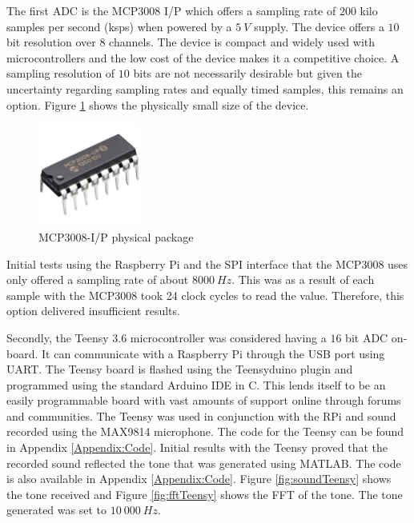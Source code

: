 The first ADC is the MCP3008 I/P which offers a sampling rate of $200$ kilo samples per second (ksps) when powered by a $5\ V$ supply. The device offers a $10$ bit resolution over 8 channels. The device is compact and widely used with microcontrollers and the low cost of the device makes it a competitive choice. A sampling resolution of $10$ bits are not necessarily desirable but given the uncertainty regarding sampling rates and equally timed samples, this remains an option. Figure \ref{fig:mcp3008} shows the physically small size of the device.

\begin{figure}[h!]
    \centering
    \includegraphics[width = 0.3\textwidth]{images/mcp3008.pdf}
    \caption{MCP3008-I/P physical package \cite{noauthor_mcp3008_nodate}}\label{fig:mcp3008}
\end{figure}

Initial tests using the Raspberry Pi and the SPI interface that the MCP3008 uses only offered a sampling rate of about $8000\ Hz$. This was as a result of each sample with the MCP3008 took 24 clock cycles to read the value. Therefore, this option delivered insufficient results.

Secondly, the Teensy 3.6 microcontroller was considered having a $16$ bit ADC on-board. It can communicate with a Raspberry Pi through the USB port using UART. The Teensy board is flashed using the Teensyduino plugin and programmed using the standard Arduino IDE in C. This lends itself to be an easily programmable board with vast amounts of support online through forums and communities. The Teensy was used in conjunction with the RPi and sound recorded using the MAX9814 microphone. The code for the Teensy can be found in Appendix \ref{Appendix:Code}. Initial results with the Teensy proved that the recorded sound reflected the tone that was generated using MATLAB. The code is also available in Appendix \ref{Appendix:Code}. Figure \ref{fig:soundTeensy} shows the tone received and Figure \ref{fig:fftTeensy} shows the FFT of the tone. The tone generated was set to $10\ 000\ Hz$.


